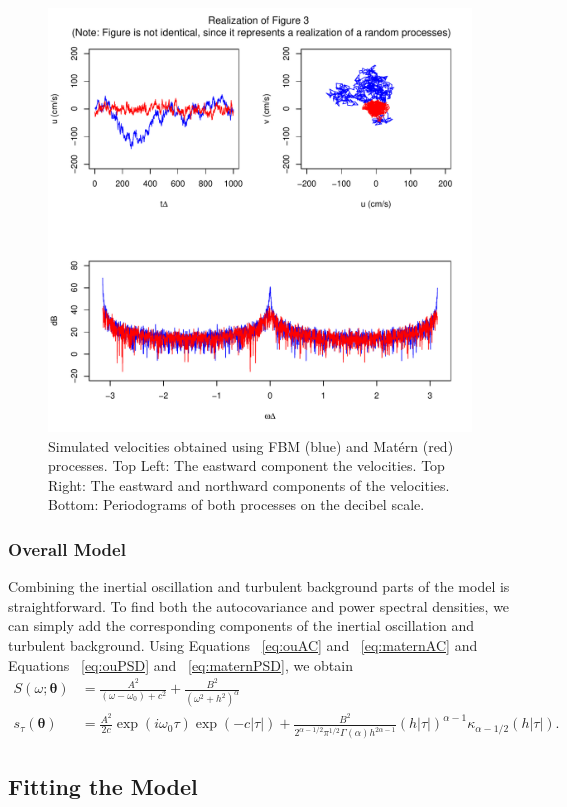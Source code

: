 \documentclass{stat572Style}
\begin{document}
\begin{figure}[hb]
	\label{fig: fmbMat}
  \centering
    \includegraphics[width=.5\textwidth]{fig3.pdf}
        \caption{Simulated velocities obtained using FBM (blue) and Mat\'{e}rn (red)  processes. Top Left: The eastward component the velocities. Top Right: The eastward and northward components of the velocities. Bottom: Periodograms of both processes on the decibel scale. }
\end{figure}

\subsubsection{Overall Model}
Combining the inertial oscillation and turbulent background parts of the model is straightforward.
 To find both the autocovariance and power spectral densities, we can simply add the corresponding components of the inertial oscillation and turbulent background. 
 Using Equations ~\ref{eq:ouAC} and ~\ref{eq:maternAC} and Equations ~\ref{eq:ouPSD} and ~\ref{eq:maternPSD}, we obtain
\begin{align}
S(\omega; \boldsymbol{\theta}) &= \frac{A^{2}}{(\omega - \omega_{0}) + c^{2}} + \frac{B^{2}}{(\omega^{2} + h^{2})^{\alpha}}\\
\label{eq: fullSpec}
s_{\tau}(\boldsymbol{\theta}) &= \frac{A^{2}}{2c} \exp(i \omega_{0}\tau) \exp(-c|\tau|) +  \frac{B^{2}}{2^{\alpha - 1/2}\pi^{1/2} \Gamma(\alpha) h^{2 \alpha - 1}}(h|\tau|)^{\alpha - 1}\kappa_{\alpha - 1/2}(h|\tau|).
\end{align}

\subsection{Fitting the Model}
\end{document}
